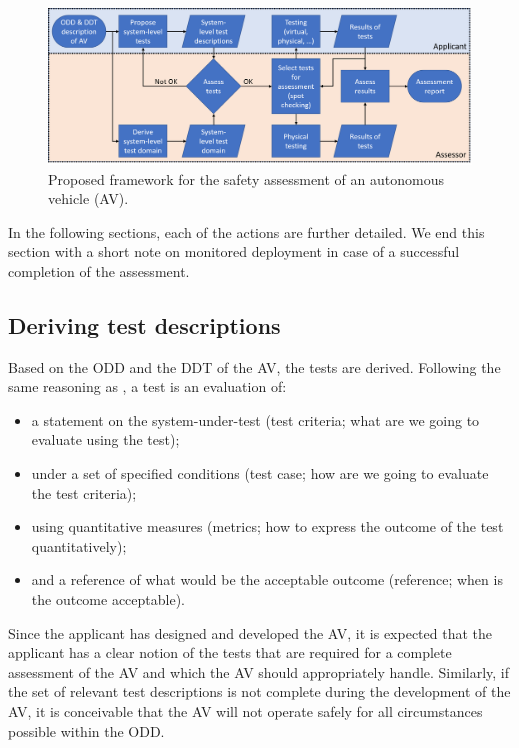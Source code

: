 \begin{figure}
	\centering
	\includegraphics[width=\linewidth]{figures/procedure}
	\caption{Proposed framework for the safety assessment of an autonomous vehicle (AV).}
	\label{fig:procedure}
\end{figure}

In the following sections, each of the actions are further detailed. We end this section with a short note on monitored deployment in case of a successful completion of the assessment.



\subsection{Deriving test descriptions}
\label{sec:test descriptions}

Based on the ODD and the DDT of the AV, the tests are derived. Following the same reasoning as \textcite{stellet2015taxonomy}, a test is an evaluation of:
\begin{itemize}
	\item a statement on the system-under-test (test criteria; what are we going to evaluate using the test);
	\item under a set of specified conditions (test case; how are we going to evaluate the test criteria);
	\item using quantitative measures (metrics; how to express the outcome of the test quantitatively);
	\item and a reference of what would be the acceptable outcome (reference; when is the outcome acceptable).
\end{itemize}

Since the applicant has designed and developed the AV, it is expected that the applicant has a clear notion of the tests that are required for a complete assessment of the AV and which the AV should appropriately handle. Similarly, if the set of relevant test descriptions is not complete during the development of the AV, it is conceivable that the AV will not operate safely for all circumstances possible within the ODD. 

